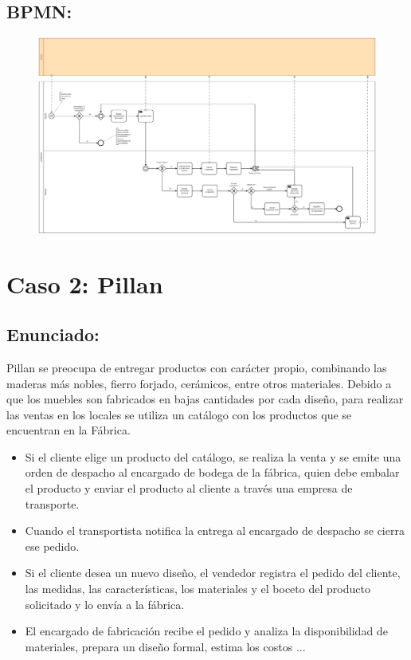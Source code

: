 \documentclass{templateApunte}
\begin{document}
\newpage
\begin{landscape}
  \subsection{BPMN: }
  \begin{figure}[H]
    \centering
    \includegraphics[width=24cm]{img/LeeRapidito.png}
  \end{figure}
\end{landscape}

\section{Caso 2: Pillan}
\subsection{Enunciado:}
Pillan se preocupa de entregar productos con carácter propio, combinando las maderas más nobles, fierro forjado, cerámicos, entre otros materiales. Debido a que los muebles son fabricados en bajas cantidades por cada diseño, para realizar las ventas en los locales se utiliza un catálogo con los productos que se encuentran en la Fábrica.
\begin{itemize}
  \item Si el cliente elige un producto del catálogo, se realiza la venta y se emite una orden de despacho al encargado de bodega de la fábrica, quien debe embalar el producto y enviar el producto al cliente a través una empresa de transporte.
  \item Cuando el transportista notifica la entrega al encargado de despacho se cierra ese pedido.
  \item Si el cliente desea un nuevo diseño, el vendedor registra el pedido del cliente, las medidas, las características, los materiales y el boceto del producto solicitado y lo envía a la fábrica.
  \item El encargado de fabricación recibe el pedido y analiza la disponibilidad de materiales, prepara un diseño formal, estima los costos ...
\end{itemize}
\end{document}
